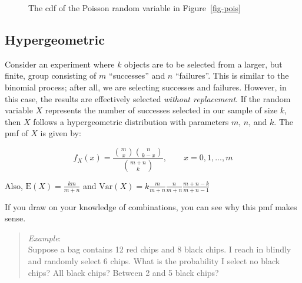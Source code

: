 \documentclass[
  letterpaper,
  DIV=11,
  numbers=noendperiod]{scrreprt}
\begin{document}
\begin{figure}[H]


\caption{\label{fig-pois2}The cdf of the Poisson random variable in
Figure~\ref{fig-pois}}

\end{figure}%

\subsection{Hypergeometric}\label{hypergeometric}

Consider an experiment where \(k\) objects are to be selected from a
larger, but finite, group consisting of \(m\) ``successes'' and \(n\)
``failures''. This is similar to the binomial process; after all, we are
selecting successes and failures. However, in this case, the results are
effectively selected \emph{without replacement}. If the random variable
\(X\) represents the number of successes selected in our sample of size
\(k\), then \(X\) follows a hypergeometric distribution with parameters
\(m\), \(n\), and \(k\). The pmf of \(X\) is given by:

\[
f_X(x) = \frac{{m \choose{x}}{n \choose{k-x}}}{{m+n \choose{k}}}, \qquad x = 0,1,...,m
\]

Also, \(\mbox{E}(X)=\frac{km}{m+n}\) and
\(\mbox{Var}(X)=k\frac{m}{m+n}\frac{n}{m+n}\frac{m+n-k}{m+n-1}\)

If you draw on your knowledge of combinations, you can see why this pmf
makes sense.

\begin{quote}
\emph{Example}:\\
Suppose a bag contains 12 red chips and 8 black chips. I reach in
blindly and randomly select 6 chips. What is the probability I select no
black chips? All black chips? Between 2 and 5 black chips?
\end{quote}
\end{document}
